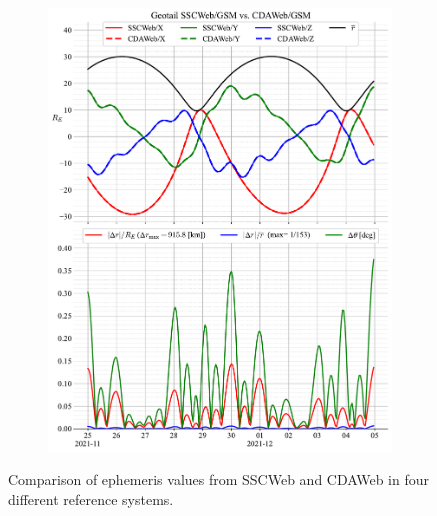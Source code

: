 \documentclass[draft]{agujournal2019}
\begin{document}
\begin{figure}[h]
\begin{subfigure}[b]{0.49\textwidth}
         \includegraphics[width=\textwidth]{figures/Geotail_SSCWeb-GSM_vs_CDAWeb-GSM.pdf}
     \end{subfigure}
     \caption{Comparison of ephemeris values from SSCWeb and CDAWeb in four different reference systems.}
     \label{fig:geotail}
\end{figure}

\clearpage
\end{document}

